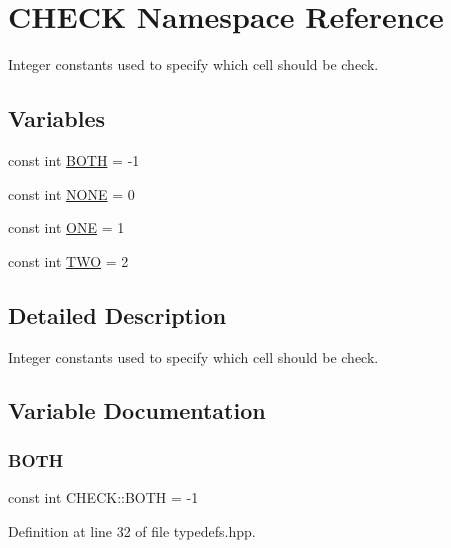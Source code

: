 \hypertarget{namespace_c_h_e_c_k}{}\section{C\+H\+E\+CK Namespace Reference}
\label{namespace_c_h_e_c_k}


Integer constants used to specify which cell should be check.  


\subsection*{Variables}
\begin{DoxyCompactItemize}
\item 
const int \hyperlink{namespace_c_h_e_c_k_a3acda1c74bfabb5b6b67e19d0ad2d52a}{B\+O\+TH} = -\/1
\item 
const int \hyperlink{namespace_c_h_e_c_k_a35fad085a9d64167bd4550445c4dc9e1}{N\+O\+NE} = 0
\item 
const int \hyperlink{namespace_c_h_e_c_k_acf8ecf93ddfb75456112712630f8f722}{O\+NE} = 1
\item 
const int \hyperlink{namespace_c_h_e_c_k_a2b112aaec4c59311376a5a60f291aa48}{T\+WO} = 2
\end{DoxyCompactItemize}


\subsection{Detailed Description}
Integer constants used to specify which cell should be check. 

\subsection{Variable Documentation}
\mbox{\label{namespace_c_h_e_c_k_a3acda1c74bfabb5b6b67e19d0ad2d52a}} 
\subsubsection{\texorpdfstring{B\+O\+TH}{BOTH}}
{\footnotesize\ttfamily const int C\+H\+E\+C\+K\+::\+B\+O\+TH = -\/1}



Definition at line 32 of file typedefs.\+hpp.

\mbox{\label{namespace_c_h_e_c_k_a35fad085a9d64167bd4550445c4dc9e1}} 
